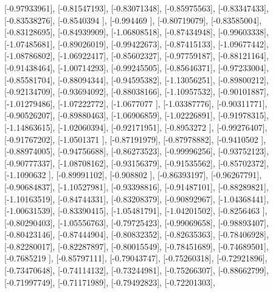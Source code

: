 \documentclass{article}
\begin{document}
       [-0.97933961],
       [-0.81547193],
       [-0.83071348],
       [-0.85975563],
       [-0.83347433],
       [-0.83538276],
       [-0.8540394 ],
       [-0.994469  ],
       [-0.80719079],
       [-0.83585004],
       [-0.83128695],
       [-0.84939909],
       [-1.06808518],
       [-0.87434948],
       [-0.99603338],
       [-1.07485681],
       [-0.89026019],
       [-0.99422673],
       [-0.87415133],
       [-1.09677442],
       [-1.08786802],
       [-1.06922417],
       [-0.85602327],
       [-0.97759187],
       [-0.88121164],
       [-0.91438464],
       [-1.00714293],
       [-0.99245505],
       [-0.85646371],
       [-0.97233004],
       [-0.85581704],
       [-0.88094344],
       [-0.94595382],
       [-1.13056251],
       [-0.89800212],
       [-0.92134709],
       [-0.93694092],
       [-0.88038166],
       [-1.10957532],
       [-0.90101887],
       [-1.01279486],
       [-1.07222772],
       [-1.0677077 ],
       [-1.03387776],
       [-0.90311771],
       [-0.90526207],
       [-0.89880463],
       [-1.06906859],
       [-1.02226891],
       [-0.91978315],
       [-1.14863615],
       [-1.02060394],
       [-0.92171951],
       [-0.8953272 ],
       [-0.99276407],
       [-0.91767202],
       [-1.0501371 ],
       [-0.87191979],
       [-0.87978882],
       [-0.9410502 ],
       [-0.88974005],
       [-0.94756688],
       [-0.86273523],
       [-0.99996256],
       [-0.93752123],
       [-0.90777337],
       [-1.08708162],
       [-0.93156379],
       [-0.91535562],
       [-0.85702372],
       [-1.1090632 ],
       [-0.89991102],
       [-0.908802  ],
       [-0.86393197],
       [-0.96267791],
       [-0.90684837],
       [-1.10527981],
       [-0.93398816],
       [-0.91487101],
       [-0.88289821],
       [-1.10163519],
       [-0.84744331],
       [-0.83208379],
       [-0.90892967],
       [-1.04368441],
       [-1.00631539],
       [-0.83390415],
       [-1.05481791],
       [-1.04201502],
       [-0.8256463 ],
       [-0.80290403],
       [-1.05556763],
       [-0.79725423],
       [-0.99069658],
       [-0.98893407],
       [-0.80423146],
       [-0.87444904],
       [-0.80832352],
       [-0.82635363],
       [-0.78406928],
       [-0.82280017],
       [-0.82287897],
       [-0.80015549],
       [-0.78451689],
       [-0.74689501],
       [-0.7685219 ],
       [-0.85797111],
       [-0.79043747],
       [-0.75260318],
       [-0.72921896],
       [-0.73470648],
       [-0.74114132],
       [-0.73244981],
       [-0.75266307],
       [-0.88662799],
       [-0.71997749],
       [-0.71171989],
       [-0.79492823],
       [-0.72201303],
\end{document}
